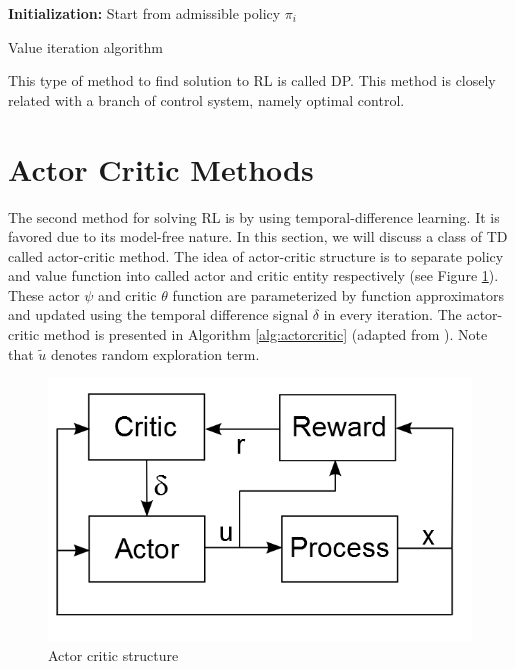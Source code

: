 \begin{algorithm}[H]
	\textbf{Initialization:} Start from admissible policy $ \pi_{i} $\\
	\label{algorithm2}
	\caption{Value iteration algorithm}
\end{algorithm}

This type of method to find solution to \ac{RL} is called \ac{DP}. This method is closely related with a branch of control system, namely optimal control.
 
\section{Actor Critic Methods} \label{sec:actor}
The second method for solving \ac{RL} is by using temporal-difference learning. It is favored due to its model-free nature. In this section, we will discuss a class of \ac{TD} called actor-critic method. The idea of actor-critic structure is to separate policy and value function into called actor and critic entity respectively (see Figure \ref{fig:actorCritic}). These actor $\psi$ and critic $\theta$ function are parameterized by function approximators and updated using the temporal difference signal $\delta$ in every iteration. The actor-critic method is presented in Algorithm \ref{alg:actorcritic} (adapted from \cite{babuskaRL}). Note that $\tilde{u}$ denotes random exploration term.

\begin{figure}[h!]
\centering
\includegraphics[width=0.6\linewidth]{actorCritic2}
\caption{Actor critic structure} 
\label{fig:actorCritic}
\end{figure}

